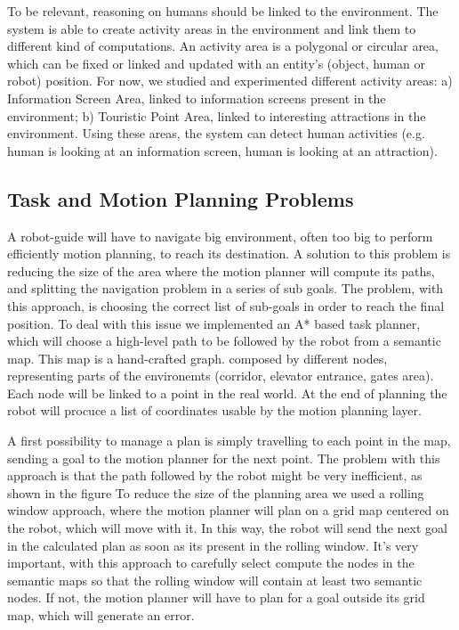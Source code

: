 To be relevant, reasoning on humans should be linked to the environment. The system is able to create activity areas in the environment and link them to different kind of computations. An activity area is a polygonal or circular area, which can be fixed or linked and updated with an entity's (object, human or robot) position. For now, we studied and experimented different activity areas: a) Information Screen Area, linked to information screens present in the environment; b) Touristic Point Area, linked to interesting attractions in the environment.
Using these areas, the system can detect human activities (e.g. human is looking at an information screen, human is looking at an attraction).


\subsection{Task and Motion Planning Problems}
A robot-guide will have to navigate big environment, often too big to perform efficiently motion planning, to reach its destination. A solution to this problem is reducing the size of the area where the motion planner will compute its paths, and splitting the navigation problem in a series of sub goals. The problem, with this approach,  is choosing the correct list of sub-goals  in order to reach the final position.  To deal with this issue we implemented an A* based task planner, which will choose a high-level path to be followed by the robot from a semantic map. This map is a hand-crafted graph. composed by different nodes, representing parts of the environemts (corridor, elevator entrance, gates area). Each node will be linked to a point in the real world. At the end of planning the robot will procuce a list of coordinates usable by the motion planning layer. 

A first possibility to manage a plan is simply travelling to each point in the map, sending a goal to the motion planner for the next point. The problem with this approach is that the path followed by the robot might be very inefficient, as shown in the figure %
To reduce the size of the planning area we used a rolling window approach, where the motion planner will plan on a grid map centered on the robot, which will move with it. In this way, the robot will send the next goal in the calculated plan as soon as its present in the rolling window. It's very important, with this approach to carefully select compute the nodes in the semantic maps so that the rolling window will contain at least two semantic nodes. If not, the motion planner will have to plan for a goal outside its grid map, which will generate an error.


